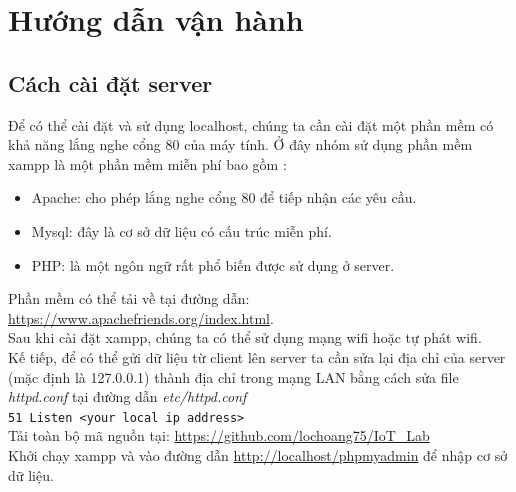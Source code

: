 \documentclass[a4paper]{article}
\begin{document}
\section{Hướng dẫn vận hành}
	\subsection{Cách cài đặt server}
	
    Để có thể cài đặt và sử dụng localhost, chúng ta cần cài đặt một phần mềm có khả năng lắng nghe cổng 80 của máy tính. Ở đây nhóm sử dụng phần mềm xampp là một phần mềm miễn phí bao gồm :
    \begin{itemize}
        \item Apache: cho phép lắng nghe cổng 80 để tiếp nhận các yêu cầu.
        \item Mysql: đây là cơ sở dữ liệu có cấu trúc miễn phí.
        \item PHP: là một ngôn ngữ rất phổ biến được sử dụng ở server.
    \end{itemize}
    
    Phần mềm có thể tải về tại đường dẫn: \url{https://www.apachefriends.org/index.html}.\\
    
    Sau khi cài đặt xampp, chúng ta có thể sử dụng mạng wifi hoặc tự phát wifi. \\
    
    Kế tiếp, để có thể gửi dữ liệu từ client lên server ta cần sửa lại địa chỉ của server (mặc định là 127.0.0.1) thành địa chỉ trong mạng LAN bằng cách sửa file \textit{httpd.conf} tại đường dẫn \textit{etc/httpd.conf}\\
    
    \lstinline{51 Listen <your local ip address>}\\
    
    Tải toàn bộ mã nguồn tại: \url{https://github.com/lochoang75/IoT_Lab}\\
    
    Khởi chạy xampp và vào đường dẫn \url{http://localhost/phpmyadmin} để 
    nhập cơ sở dữ liệu.
    
\end{document}
